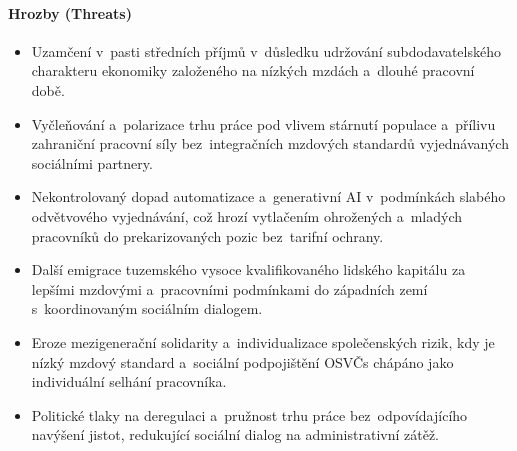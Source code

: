 \paragraph{Hrozby (Threats)}\label{par:swot_t}
\begin{itemize}[noitemsep]
	\item Uzamčení  v~pasti středních příjmů v~důsledku udržování subdodavatelského charakteru ekonomiky založeného na nízkých mzdách a~dlouhé pracovní době.
	\item Vyčleňování a~polarizace trhu práce pod vlivem stárnutí populace a~přílivu zahraniční pracovní síly bez~integračních mzdových standardů vyjednávaných sociálními partnery.
	\item Nekontrolovaný dopad automatizace a~generativní \acs{AI} v~podmínkách slabého odvětvového vyjednávání, což hrozí vytlačením ohrožených a~mladých pracovníků do prekarizovaných pozic bez~tarifní ochrany.
	\item Další emigrace tuzemského vysoce kvalifikovaného lidského kapitálu za lepšími mzdovými a~pracovními podmínkami do západních zemí s~koordinovaným sociálním dialogem.
	\item Eroze mezigenerační solidarity a~individualizace společenských rizik, kdy je nízký mzdový standard a~sociální podpojištění \acp{OSVČ} chápáno jako individuální selhání pracovníka.
	\item Politické tlaky na deregulaci a~pružnost trhu práce bez~odpovídajícího navýšení jistot, redukující sociální dialog na administrativní zátěž.
\end{itemize}

